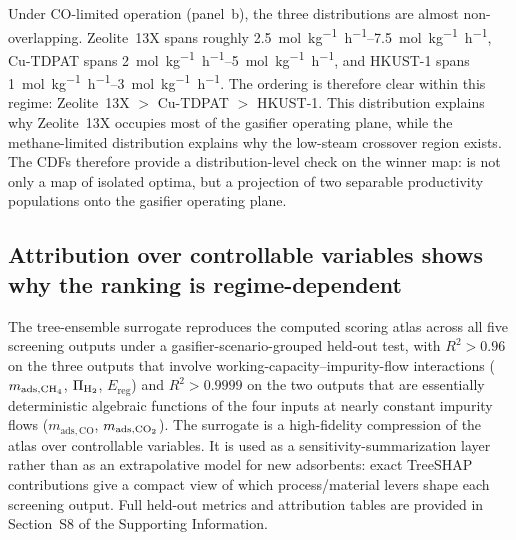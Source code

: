 \documentclass[11pt,a4paper]{article}
\newcommand{\Htwo}{\ce{H2}}
\newcommand{\COtwo}{\ce{CO2}}
\newcommand{\CHfour}{\ce{CH4}}
\begin{document}
Under CO-limited operation (panel~b), the three distributions are almost
non-overlapping. Zeolite~13X spans roughly
\SIrange{2.5}{7.5}{mol.kg^{-1}.h^{-1}}, Cu-TDPAT spans
\SIrange{2}{5}{mol.kg^{-1}.h^{-1}}, and HKUST-1 spans
\SIrange{1}{3}{mol.kg^{-1}.h^{-1}}. The ordering is therefore clear within
this regime: Zeolite~13X $>$ Cu-TDPAT $>$ HKUST-1. This distribution explains
why Zeolite~13X occupies most of the gasifier operating plane, while the
methane-limited distribution explains why the low-steam crossover region
exists. The CDFs therefore provide a distribution-level check on the winner map:
 is not only a map of isolated optima, but a projection of two
separable productivity populations onto the gasifier operating plane.

\subsection{Attribution over controllable variables shows why the ranking is regime-dependent}
\label{sec:shap}

The tree-ensemble surrogate reproduces the computed scoring atlas across all
five screening outputs under a gasifier-scenario-grouped held-out test, with
$R^2 > 0.96$ on the three outputs that involve working-capacity--impurity-flow
interactions ($m_{\mathrm{ads},\CHfour}$, $\Pi_{\Htwo}$, $E_{\mathrm{reg}}$) and
$R^2 > 0.9999$ on the two outputs that are essentially deterministic algebraic
functions of the four inputs at nearly constant impurity flows
($m_{\mathrm{ads},\mathrm{CO}}$, $m_{\mathrm{ads},\COtwo}$). The surrogate is a
high-fidelity compression of the atlas over controllable variables. It is used
as a sensitivity-summarization layer rather than as an extrapolative model for
new adsorbents: exact TreeSHAP contributions give a compact view of which
process/material levers shape each screening output. Full held-out metrics and
attribution tables are provided in Section~S8 of the Supporting Information.

\end{document}
